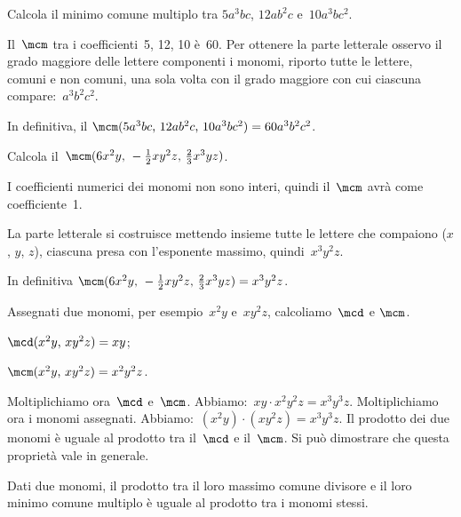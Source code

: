 \begin{exrig}
 \begin{esempio}
Calcola il minimo comune multiplo tra
$5a^{3}bc$, $12ab^{2}c$ e~$10a^{3}bc^{2}$.

Il~$\mcm$ tra i coefficienti~5, 12, 10 è~60. Per ottenere la parte
letterale osservo il grado maggiore delle lettere componenti i
monomi, riporto tutte le lettere, comuni e non comuni, una sola volta
con il grado maggiore con cui ciascuna compare:~$a^{3}b^{2}c^{2}$.

In definitiva, il
$\mcm(5a^{3}bc\text{,~}12ab^{2}c\text{,~}10a^{3}bc^{2})=60a^{3}b^{2}c^{2}$.
 \end{esempio}

 \begin{esempio}
Calcola il~$\mcm(6x^{2}y\text{,~}-\frac{1}{2}xy^{2}z\text{,~}\frac{2}{3}x^{3}yz)$.

I coefficienti numerici dei monomi non sono interi, quindi il~$\mcm$
avrà come coefficiente~1.

La parte letterale si costruisce mettendo insieme tutte le lettere che
compaiono ($x$, $y$, $z$), ciascuna presa con
l'esponente massimo, quindi~$x^{3}y^{2}z$.

In definitiva
$\mcm(6x^{2}y\text{,~}-\frac{1}{2}xy^{2}z\text{,~}\frac{2}{3}x^{3}yz)=x^{3}y^{2}z$.
 \end{esempio}
\end{exrig}

Assegnati due monomi, per esempio~$x^{2}y$ e~$xy^{2}z$,
calcoliamo~$\mcd$ e $\mcm$.
\begin{itemize*}
\item $\mcd(x^{2}y\text{,~}xy^{2}z)=xy$;
\item $\mcm(x^{2}y\text{,~}xy^{2}z)=x^{2}y^{2}z$.
\end{itemize*}
Moltiplichiamo ora~$\mcd$ e~$\mcm$. Abbiamo:~$xy\cdot x^{2}y^{2}z= x^{3}y^{3}z.$
Moltiplichiamo ora i monomi assegnati. Abbiamo:~$(x^{2}y)\cdot (xy^{2}z)=x^{3}y^{3}z.$
Il prodotto dei due monomi è uguale al prodotto tra il~$\mcd$ e
il~$\mcm$. Si può dimostrare che questa proprietà vale in generale.

\begin{proprieta}
 Dati due monomi, il prodotto tra il loro massimo comune
divisore e il loro minimo comune multiplo è uguale al prodotto tra i
monomi stessi.
\end{proprieta}

\ovalbox{\risolvii \ref{ese:10.44}, \ref{ese:10.45}, \ref{ese:10.46}, \ref{ese:10.47}, \ref{ese:10.48}, \ref{ese:10.49}, \ref{ese:10.50}}

\newpage

\cleardoublepage
